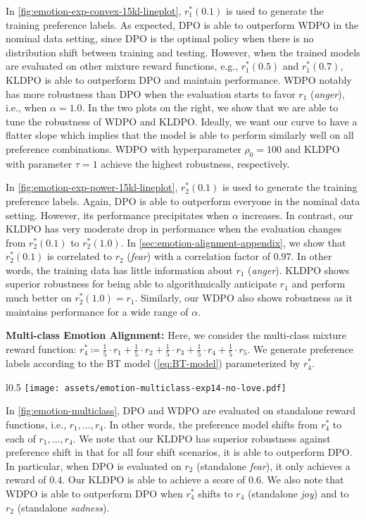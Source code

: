In \cref{fig:emotion-exp-convex-15kl-lineplot}, $r^*_1(0.1)$ is used to generate the training preference labels. As expected, DPO is able to outperform WDPO in the nominal data setting, since DPO is the optimal policy when there is no distribution shift between training and testing. However, when the trained models are evaluated on other mixture reward functions, e.g., $r^*_1(0.5)$ and $r^*_1(0.7)$, KLDPO is able to outperform DPO and maintain performance. WDPO notably has more robustness than DPO when the evaluation starts to favor $r_1$ (\textit{anger}), i.e., when $\alpha=1.0$. In the two plots on the right, we show that we are able to tune the robustness of WDPO and KLDPO. Ideally, we want our curve to have a flatter slope which implies that the model is able to perform similarly well on all preference combinations. WDPO with hyperparameter $\rho_0=100$ and KLDPO with parameter $\tau=1$ achieve the highest robustness, respectively. 

In \cref{fig:emotion-exp-power-15kl-lineplot}, $r^*_2(0.1)$ is used to generate the training preference labels. Again, DPO is able to outperform everyone in the nominal data setting. However, its performance precipitates when $\alpha$ increases. In contrast, our KLDPO has very moderate drop in performance when the evaluation changes from $r^*_2(0.1)$ to $r^*_2(1.0)$. In \cref{sec:emotion-alignment-appendix}, we show that $r^*_2(0.1)$ is correlated to $r_2$ (\textit{fear}) with a correlation factor of $0.97$. In other words, the training data has little information about $r_1$ (\textit{anger}). KLDPO shows superior robustness for being able to algorithmically anticipate $r_1$ and perform much better on $r^*_2(1.0)=r_1$. Similarly, our WDPO also shows robustness as it maintains performance for a wide range of $\alpha$.

\textbf{Multi-class Emotion Alignment: } Here, we consider the multi-class mixture reward function: $r^*_4 \coloneqq \frac{1}{5} \cdot r_1 + \frac{1}{5}\cdot r_2 + \frac{1}{5}\cdot r_3 + \frac{1}{5} \cdot r_4 + \frac{1}{5} \cdot r_5$. We generate preference labels according to the BT model (\cref{eq:BT-model}) parameterized by $r_4^*$. 

\begin{wrapfigure}{l}{0.5\textwidth}
    \centering
    \texttt{[image: assets/emotion-multiclass-exp14-no-love.pdf]}
    \caption{Evaluation of DPO, WDPO, KLDPO, and Dr. DPO. The training preference labels are generated by $r^*_4$.}
    \label{fig:emotion-multiclass}
\end{wrapfigure}


In \cref{fig:emotion-multiclass}, DPO and WDPO are evaluated on standalone reward functions, i.e., $r_1,\dots, r_4$. In other words, the preference model shifts from $r^*_4$ to each of $r_1,\dots, r_4$. We note that our KLDPO has superior robustness against preference shift in that for all four shift scenarios, it is able to outperform DPO. In particular, when DPO is evaluated on $r_2$ (standalone \textit{fear}), it only achieves a reward of $0.4$. Our KLDPO is able to achieve a score of $0.6$. We also note that WDPO is able to outperform DPO when $r^*_4$ shifts to $r_4$ (standalone \textit{joy}) and to $r_2$ (standalone \textit{sadness}).


